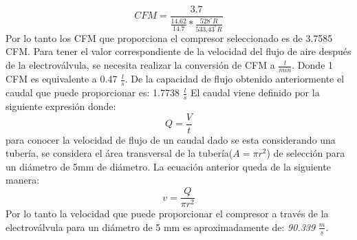 \begin{equation}
	CFM=\frac{3.7}{\frac{14.62}{14.7}*\frac{528^\circ R}{533.43^\circ R}}
\end{equation}
Por lo tanto los CFM que proporciona el compresor seleccionado es de 3.7585 CFM.
\newline
Para tener el valor correspondiente de la velocidad del flujo de aire después de la electrov\'alvula, se necesita realizar la conversión de CFM a $\frac{l}{min}$. Donde 1 CFM es equivalente a 0.47 $\frac{l}{s}$. De la capacidad de flujo obtenido anteriormente el caudal que puede proporcionar es: 1.7738 $\frac{l}{s}$
\newline
El caudal viene definido por la siguiente expresi\'on donde:
\begin{equation}
	Q=\frac{V}{t}
\end{equation}
para conocer la velocidad de flujo de un caudal dado se esta considerando una tubería, se considera el área transversal de la tubería($A=\pi r^2$) de selección para un diámetro de 5mm de diámetro. 
\newline
La ecuación anterior queda de la siguiente manera: 
\begin{equation}
	v=\frac{Q}{\pi r^2}
\end{equation}
Por lo tanto la velocidad que puede proporcionar el compresor a través de la electrov\'alvula para un diámetro de 5 mm es aproximadamente de: \textit {90.339} $\frac{m}{s}$\cite{Atlas2014}.